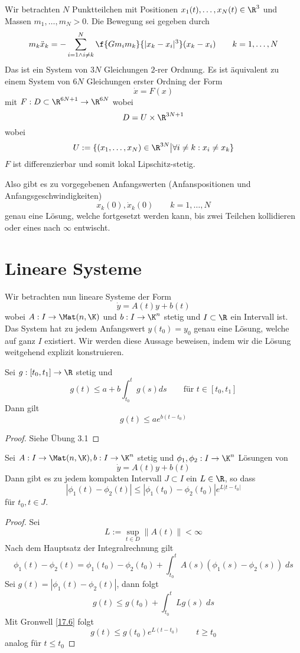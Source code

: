 \documentclass[a4paper,10pt]{scrbook}
\begin{document}
\begin{ex*}
	Wir betrachten $N$ Punktteilchen mit Positionen $x_1(t),\dotsc, x_N(t)\in \R^3$ und Massen $m_1,\dotsc,m_N>0$.
	Die Bewegung sei gegeben durch
	\[
		m_k \ddot x_k = -\sum_{i=1 \land i\neq k}^N \f{Gm_im_k}{|x_k-x_i|^3}(x_k-x_i) \qquad k=1,\dotsc, N
	\]
	Das ist ein System von $3N$ Gleichungen $2$-rer Ordnung.
	Es ist äquivalent zu einem System von $6N$ Gleichungen erster Ordning der Form
	\[
		\dot x = F(x)
	\]
	mit $F:D\subset \R^{6N+1}\to \R^{6N}$ wobei
	\[
		D = U \times \R^{3N+1}
	\]
	wobei
	\[
		U := \{(x_1,\dotsc,x_N)\in \R^{3N}\big| \forall i\neq k: x_i\neq x_k \}
	\]
	$F$ ist differenzierbar und somit lokal Lipschitz-stetig.

	Also gibt es zu vorgegebenen Anfangswerten (Anfanspositionen und Anfangsgeschwindigkeiten)
	\[
		x_k(0), \dot x_k(0) \qquad k=1,\dotsc, N
	\]
	genau eine Lösung, welche fortgesetzt werden kann, bis zwei Teilchen kollidieren oder eines nach $\infty$ entwischt.
\end{ex*}


\section{Lineare Systeme}


Wir betrachten nun lineare Systeme der Form
\[
	\dot y = A(t) y + b(t)
\]
wobei $A: I \to \Mat(n,\K)$ und $b :I \to \K^n$ stetig und $I\subset \R$ ein Intervall ist.
Das System hat zu jedem Anfangswert $y(t_0) = y_0$ genau eine Lösung, welche auf ganz $I$ existiert.
Wir werden diese Aussage beweisen, indem wir die Lösung weitgehend explizit konstruieren.

\begin{lem}[Gronwell]
	\label{17.6}
	Sei $g: [t_0,t_1] \to \R$ stetig und
	\[
		g(t) \le a + b\int_{t_0}^t g(s) ds \qquad \text{für $t\in [t_0,t_1]$}
	\]
	Dann gilt
	\[
		g(t) \le ae^{b(t-t_0)}
	\]
	\begin{proof}	
		Siehe Übung 3.1
	\end{proof}
\end{lem}

\begin{st}
	\label{17.7}
	Sei $A:I \to \Mat(n,\K), b:I\to \K^n$ stetig und $\phi_1,\phi_2: I \to \K^n$ Lösungen von
	\[
		\dot y = A(t) y + b(t)
	\]
	Dann gibt es zu jedem kompakten Intervall $J\subset I$ ein $L\in \R$, so dass
	\[
		|\phi_1(t) - \phi_2(t)| \le |\phi_1(t_0) -\phi_2(t_0)| e^{L|t-t_0|}
	\]
	für $t_0, t\in J$.
	\begin{proof}
		Sei
		\[
			L := \sup_{t\in D}\|A(t)\| < \infty
		\]
		Nach dem Hauptsatz der Integralrechnung gilt
		\[
			\phi_1(t) - \phi_2(t) = \phi_1(t_0) - \phi_2(t_0) + \int_{t_0}^t A(s) (\phi_1(s) - \phi_2(s))\; ds
		\]
		Sei $g(t) = |\phi_1(t) - \phi_2(t)|$, dann folgt
		\[
			g(t) \le g(t_0) + \int_{t_0}^tLg(s)\; ds
		\]
		Mit Gronwell \ref{17.6} folgt
		\[
			g(t) \le g(t_0) e^{L(t-t_0)} \qquad t\ge t_0
		\]
		analog für $t\le t_0$

	\end{proof}
\end{st}
\end{document}
